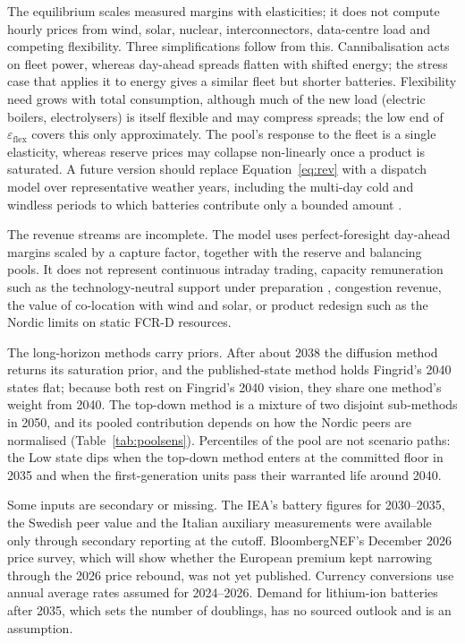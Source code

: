 \documentclass[11pt]{article}
\begin{document}
The equilibrium scales measured margins with elasticities; it does not compute hourly prices from wind, solar, nuclear, interconnectors, data-centre load and competing flexibility.
Three simplifications follow from this. Cannibalisation acts on fleet power, whereas day-ahead spreads flatten with shifted energy; the stress case that applies it to energy gives a similar fleet but shorter batteries. Flexibility need grows with total consumption, although much of the new load (electric boilers, electrolysers) is itself flexible and may compress spreads; the low end of $\varepsilon_{\mathrm{flex}}$ covers this only approximately. The pool's response to the fleet is a single elasticity, whereas reserve prices may collapse non-linearly once a product is saturated.
A future version should replace Equation~\eqref{eq:rev} with a dispatch model over representative weather years, including the multi-day cold and windless periods to which batteries contribute only a bounded amount \citep{ieso2025elcc}.

The revenue streams are incomplete. The model uses perfect-foresight day-ahead margins scaled by a capture factor, together with the reserve and balancing pools. It does not represent continuous intraday trading, capacity remuneration such as the technology-neutral support under preparation \citep{tem2025flex}, congestion revenue, the value of co-location with wind and solar, or product redesign such as the Nordic limits on static FCR-D resources.

The long-horizon methods carry priors. After about 2038 the diffusion method returns its saturation prior, and the published-state method holds Fingrid's 2040 states flat; because both rest on Fingrid's 2040 vision, they share one method's weight from 2040. The top-down method is a mixture of two disjoint sub-methods in 2050, and its pooled contribution depends on how the Nordic peers are normalised (Table~\ref{tab:poolsens}).
Percentiles of the pool are not scenario paths: the Low state dips when the top-down method enters at the committed floor in 2035 and when the first-generation units pass their warranted life around 2040.

Some inputs are secondary or missing. The IEA's battery figures for 2030--2035, the Swedish peer value and the Italian auxiliary measurements were available only through secondary reporting at the cutoff. BloombergNEF's December 2026 price survey, which will show whether the European premium kept narrowing through the 2026 price rebound, was not yet published. Currency conversions use annual average rates assumed for 2024--2026. Demand for lithium-ion batteries after 2035, which sets the number of doublings, has no sourced outlook and is an assumption.
\end{document}
